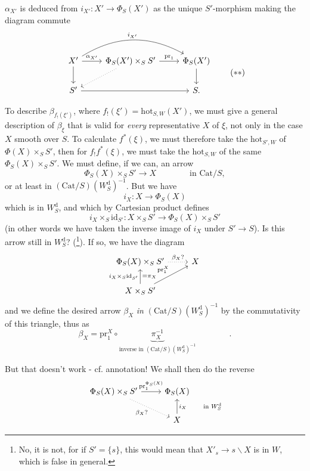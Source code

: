\documentclass[11pt]{article}
\newcommand{\printedpage}[1]{\marginpar{\footnotesize p.~#1}}
\newcommand{\msp}[1]{\marginpar{\footnotesize [#1]}}
\newcommand{\hot}{\mathrm{hot}}
\newcommand{\Cat}{\mathrm{Cat}}
\newcommand{\id}{\mathrm{id}}
\newcommand{\pr}{\mathrm{pr}}
\newcommand{\Wd}{W^{\mathrm{d}}}
\begin{document}
$\alpha_{X'}$ is deduced from $i_{X'} : X'\longrightarrow\Phi_S(X')$ as the unique $S'$-morphism making the diagram commute
\[
\begin{tikzcd}
X' \arrow[r, "{\alpha_{X'}}"] \arrow[d] \arrow[rr, bend left, "{i_{X'}}"] & \Phi_S(X')\times_S S' \arrow[r, "\pr_1"] \arrow[dl, dotted] & \Phi_S(X') \arrow[d] \\ %
S' \arrow[rr] & & S.
\end{tikzcd}
\tag*{$(**)$}
\]

To describe $\beta_{f_!(\xi')}$, where $f_!(\xi') = \hot_{S,W}(X')$, we must give a general description of $\beta_\xi$ that is valid for \textit{every} representative $X$ of $\xi$, not only in the case $X$ smooth over $S$. To calculate $f^*(\xi)$, we must therefore take the $\hot_{S',W}$ of $\Phi(X)\times_S S'$, then for $f_!f^*(\xi)$, we \msp{page 142}must take the $\hot_{S,W}$ of the same $\Phi_S(X)\times_S S'$. We must define, if we can, an arrow
\[
\Phi_S(X)\times_S S' \longrightarrow X \qquad\qquad \text{in } \Cat/S,
\]
or at least in $(\Cat/S)(\Wd_S)^{-1}$. But we have
\[
i_X : X \longrightarrow \Phi_S(X)
\]
which is in $\Wd_S$, and which by Cartesian product defines
\[
i_X\times_S\id_{S'} : X\times_S S' \longrightarrow \Phi_S(X)\times_S S'
\]
(in other words we have taken the inverse image of $i_X$ under $S'\longrightarrow S$). Is this arrow still in $\Wd_S$? (\footnote[69]{No, it is not, for if $S'=\{s\}$, this would mean that $X'_s\longrightarrow s\backslash X$ is in $W$, which is false in general.}). If so, we have the diagram
\printedpage{87}
\[
\begin{tikzcd}
\Phi_S(X)\times_S S' \arrow[r, dotted, "\beta_X ?"] & X \\
X\times_S S' \arrow[u, "{i_X\times_S\id_{S'}}", "{=\pi_X}"'] \arrow[ur, "\pr_1^X"] &
\end{tikzcd}
\]
and we define the desired arrow $\beta_X$ \textit{in} $(\Cat/S)(\Wd_S)^{-1}$ by the commutativity of this triangle, thus as
\[
\beta_X = \pr_1^X\circ\underbrace{\pi_X^{-1}}_{\text{inverse in }(\Cat/S)(\Wd_S)^{-1}} \qquad\qquad .
\]

\leavevmode\msp{page 143}But that doesn't work - cf. annotation! We shall then do the reverse
\[
\begin{tikzcd}
\Phi_S(X)\times_S S' \arrow[r, "\pr_1^{\Phi_S(X)}"] \arrow[dr, dotted, "\beta_X ?"'] & \Phi_S(X) \\
 & X \arrow[u, "{i_X \qquad \text{in } \Wd_S}"']
\end{tikzcd}
\]
\end{document}
